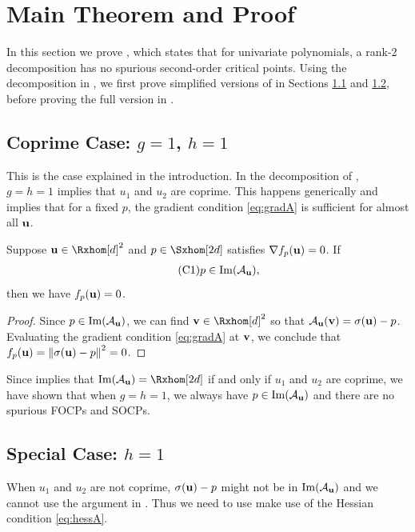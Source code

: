 \documentclass[final,onefignum,onetabnum]{siamart220329}
\begin{document}
\section{Main Theorem and Proof}
\label{sec:main-proof}
In this section we prove , which states that for univariate
polynomials, a rank-2 decomposition has no spurious second-order critical
points. Using the decomposition in , we first prove simplified
versions of  in Sections \ref{sec:g=1_h=1} and \ref{sec:h=1},
before proving the full version in .

\subsection{Coprime Case: $g=1$, $h=1$}
\label{sec:g=1_h=1}
This is the case explained in the introduction.
In the decomposition of , $g = h = 1$ implies that $u_1$ and
$u_2$ are coprime. This happens generically and implies that for a fixed $p$,
the gradient condition \eqref{eq:gradA} is sufficient for almost all $\boldsymbol{\mathbf{u}}$.
\begin{proposition} \label{prop:first_order_property}
  Suppose $\vecp{u} \in \Rxhom[d]^2$ and $p \in \Sxhom[2d]$ satisfies
  $\nabla f_p(\boldsymbol{\mathbf{u}}) = 0$. If
  \begin{align} \tag{C1}\label{eq:first_order_prop}
    p \in \operatorname{Im}(\mathcal{A}_{\boldsymbol{\mathbf{u}}}),
  \end{align}
  then we have $f_p(\boldsymbol{\mathbf{u}}) = 0$.
\end{proposition}
\begin{proof}
  Since $p \in \operatorname{Im}(\mathcal{A}_{\boldsymbol{\mathbf{u}}})$, we can find $\vecp{v} \in \Rxhom[d]^2$ so that
  $\mathcal{A}_{\boldsymbol{\mathbf{u}}}(\boldsymbol{\mathbf{v}}) = \sigma(\boldsymbol{\mathbf{u}}) - p$. Evaluating the gradient condition
  \eqref{eq:gradA} at $\boldsymbol{\mathbf{v}}$, we conclude that
  $f_p(\boldsymbol{\mathbf{u}}) = \left\lVert \sigma(\boldsymbol{\mathbf{u}}) - p \right\lVert^2 = 0$.
\end{proof}
Since  implies that $\imag(\Aup) = \Rxhom[2d]$ if and
only if $u_1$ and $u_2$ are coprime, we have shown that when $g = h = 1$, we
always have $p \in \operatorname{Im}(\mathcal{A}_{\boldsymbol{\mathbf{u}}})$ and there are no spurious FOCPs and SOCPs.

\subsection{Special Case: $h=1$}
\label{sec:h=1}
When $u_1$ and $u_2$ are not coprime, $\sigma(\boldsymbol{\mathbf{u}}) - p $ might not be in
$\operatorname{Im}(\mathcal{A}_{\boldsymbol{\mathbf{u}}})$ and we cannot use the argument in
. Thus we need to use make use of the Hessian
condition \eqref{eq:hessA}.
\end{document}
